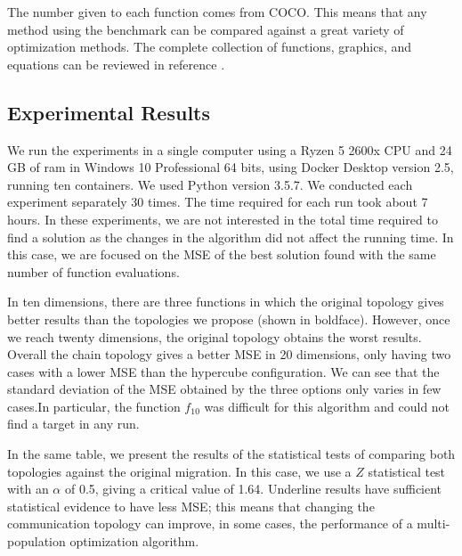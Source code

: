 \documentclass[runningheads]{llncs}
\begin{document}
The number given to each function comes from COCO. This means that any method
using the benchmark can be compared against a great variety of optimization
methods. The complete collection of functions, graphics, and equations can be
reviewed in reference \cite{bbob}.


\subsection{Experimental Results}

We run the experiments in a single computer using a Ryzen 5 2600x CPU and 24 GB
of ram in Windows 10 Professional 64 bits, using Docker Desktop version 2.5,
running ten containers. We used Python version 3.5.7. We conducted each
experiment separately 30 times. The time required for each run took about 7
hours. In these experiments, we are not interested in the total time required to
find a solution as the changes in the algorithm did not affect the running time.
In this case, we are focused on the MSE of the best solution found with the same
number of function evaluations.

In ten dimensions, there are three functions in which the original topology
gives better results than the topologies we propose (shown in boldface).
However, once we reach twenty dimensions, the original topology obtains the
worst results. Overall the chain topology gives a better MSE in 20 dimensions,
only having two cases with a lower MSE than the hypercube configuration. We can
see that the standard deviation of the MSE obtained by the three options only
varies in few cases.In particular, the function $f_{10}$ was difficult for this
algorithm and could not find a target in any run.  

In the same table, we present the results of the statistical tests of comparing
both topologies against the original migration. In this case, we use a \(Z\)
statistical test with an $\alpha$ of 0.5, giving a critical value of 1.64.
Underline results have sufficient statistical evidence to have less MSE; this
means that changing the communication topology can improve, in some cases, the
performance of a multi-population optimization algorithm.


\end{document}
